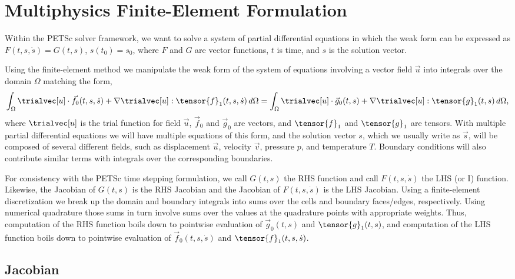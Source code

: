 \section{Multiphysics Finite-Element Formulation}
\label{sec:multiphysics:formulation}

Within the PETSc solver framework, we want to solve a system of
partial differential equations in which the weak form can be
expressed as $F(t,s,\dot{s}) = G(t,s)$, $s(t_0) = s_0$, where $F$ and
$G$ are vector functions, $t$ is time, and $s$ is the solution vector.

Using the finite-element method we manipulate the weak form of the
system of equations involving a vector field $\vec{u}$ into integrals
over the domain $\Omega$ matching the form,
\begin{equation}
  \label{eqn:problem:form}
  \int_\Omega \trialvec[u] \cdot \vec{f}_0(t,s,\dot{s}) + \nabla \trialvec[u] : \tensor{f}
_1(t,s,\dot{s}) \, 
d\Omega =
  \int_\Omega \trialvec[u] \cdot \vec{g}_0(t,s) + \nabla \trialvec[u] : \tensor{g}_1(t,s) \, 
d\Omega,
\end{equation}
where $\trialvec[u]$ is the trial function for field $\vec{u}$,
$\vec{f}_0$ and $\vec{g}_0$ are vectors, and $\tensor{f}_1$ and
$\tensor{g}_1$ are tensors. With multiple partial differential
equations we will have multiple equations of this form, and the
solution vector $s$, which we usually write as $\vec{s}$, will be
composed of several different fields, such as displacement $\vec{u}$,
velocity $\vec{v}$, pressure $p$, and temperature $T$. Boundary
conditions will also contribute similar terms with integrals over the
corresponding boundaries.

For consistency with the PETSc time stepping formulation, we call
$G(t,s)$ the RHS function and call $F(t,s,\dot{s})$ the LHS (or I)
function. Likewise, the Jacobian of $G(t,s)$ is the RHS Jacobian and
the Jacobian of $F(t,s,\dot{s})$ is the LHS Jacobian.  Using a
finite-element discretization we break up the domain and boundary
integrals into sums over the cells and boundary faces/edges,
respectively. Using numerical quadrature those sums in turn involve
sums over the values at the quadrature points with appropriate
weights. Thus, computation of the RHS function boils down to pointwise
evaluation of $\vec{g}_0(t,s)$ and $\tensor{g}_1(t,s)$, and
computation of the LHS function boils down to pointwise evaluation of
$\vec{f}_0(t,s,\dot{s})$ and $\tensor{f}_1(t,s,\dot{s})$.

\subsection{Jacobian}

